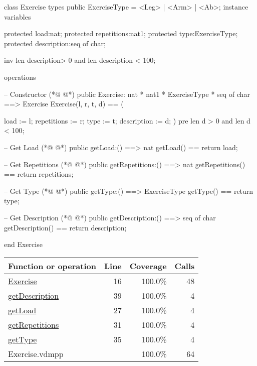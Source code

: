 \begin{vdmpp}[breaklines=true]
class Exercise
types
 public ExerciseType = <Leg> | <Arm> | <Ab>;
instance variables
 
 protected load:nat;
 protected repetitions:nat1;
 protected type:ExerciseType;
 protected description:seq of char;
 
 inv len description> 0 and len description < 100;
 
operations
 
 -- Constructor
(*@
\label{Exercise:16}
@*)
 public Exercise: nat * nat1 * ExerciseType * seq of char ==> Exercise
 Exercise(l, r, t, d) == (
  
  load := l;
  repetitions := r;
  type := t;
  description := d;
 )
 pre len d > 0 and len d < 100;
 
  -- Get Load
(*@
\label{getLoad:27}
@*)
  public getLoad:() ==> nat
  getLoad() == return load;
  
  -- Get Repetitions
(*@
\label{getRepetitions:31}
@*)
  public getRepetitions:() ==> nat
  getRepetitions() == return repetitions;
  
  -- Get Type
(*@
\label{getType:35}
@*)
  public getType:() ==> ExerciseType
  getType() == return type;
  
  -- Get Description
(*@
\label{getDescription:39}
@*)
  public getDescription:() ==> seq of char
  getDescription() == return description;
  
end Exercise
\end{vdmpp}
\bigskip
\begin{longtable}{|l|r|r|r|}
\hline
Function or operation & Line & Coverage & Calls \\
\hline
\hline
\hyperref[Exercise:16]{Exercise} & 16&100.0\% & 48 \\
\hline
\hyperref[getDescription:39]{getDescription} & 39&100.0\% & 4 \\
\hline
\hyperref[getLoad:27]{getLoad} & 27&100.0\% & 4 \\
\hline
\hyperref[getRepetitions:31]{getRepetitions} & 31&100.0\% & 4 \\
\hline
\hyperref[getType:35]{getType} & 35&100.0\% & 4 \\
\hline
\hline
Exercise.vdmpp & & 100.0\% & 64 \\
\hline
\end{longtable}

